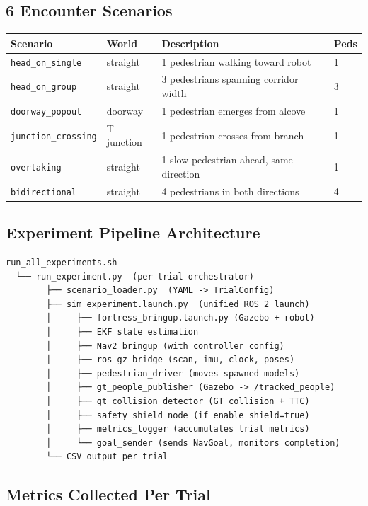 \documentclass[11pt]{article}
\begin{document}
\subsection*{6 Encounter Scenarios}

\begin{tabular}{llp{6cm}l}
\hline
\textbf{Scenario} & \textbf{World} & \textbf{Description} & \textbf{Peds} \\
\hline
\texttt{head\_on\_single} & straight & 1 pedestrian walking toward robot & 1 \\
\texttt{head\_on\_group} & straight & 3 pedestrians spanning corridor width & 3 \\
\texttt{doorway\_popout} & doorway & 1 pedestrian emerges from alcove & 1 \\
\texttt{junction\_crossing} & T-junction & 1 pedestrian crosses from branch & 1 \\
\texttt{overtaking} & straight & 1 slow pedestrian ahead, same direction & 1 \\
\texttt{bidirectional} & straight & 4 pedestrians in both directions & 4 \\
\hline
\end{tabular}

\subsection*{Experiment Pipeline Architecture}

\begin{verbatim}
run_all_experiments.sh
  └── run_experiment.py  (per-trial orchestrator)
        ├── scenario_loader.py  (YAML -> TrialConfig)
        ├── sim_experiment.launch.py  (unified ROS 2 launch)
        │     ├── fortress_bringup.launch.py (Gazebo + robot)
        │     ├── EKF state estimation
        │     ├── Nav2 bringup (with controller config)
        │     ├── ros_gz_bridge (scan, imu, clock, poses)
        │     ├── pedestrian_driver (moves spawned models)
        │     ├── gt_people_publisher (Gazebo -> /tracked_people)
        │     ├── gt_collision_detector (GT collision + TTC)
        │     ├── safety_shield_node (if enable_shield=true)
        │     ├── metrics_logger (accumulates trial metrics)
        │     └── goal_sender (sends NavGoal, monitors completion)
        └── CSV output per trial
\end{verbatim}

\subsection*{Metrics Collected Per Trial}
\end{document}

